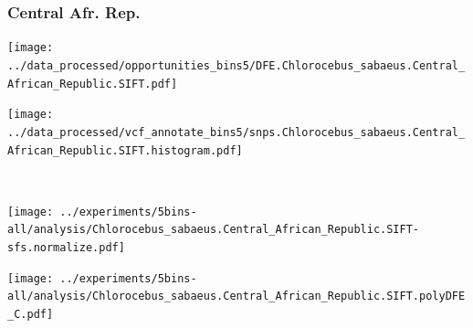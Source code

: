 \subsubsection{Central Afr. Rep.}

\begin{minipage}{0.49\linewidth}
    \texttt{[image: ../data\_processed/opportunities\_bins5/DFE.Chlorocebus\_sabaeus.Central\_African\_Republic.SIFT.pdf]}
\end{minipage}
\begin{minipage}{0.49\linewidth}
    \texttt{[image: ../data\_processed/vcf\_annotate\_bins5/snps.Chlorocebus\_sabaeus.Central\_African\_Republic.SIFT.histogram.pdf]}
\end{minipage}
\\
\begin{minipage}{0.49\linewidth}
    \texttt{[image: ../experiments/5bins-all/analysis/Chlorocebus\_sabaeus.Central\_African\_Republic.SIFT-sfs.normalize.pdf]}
\end{minipage}
\begin{minipage}{0.4\linewidth}
    \texttt{[image: ../experiments/5bins-all/analysis/Chlorocebus\_sabaeus.Central\_African\_Republic.SIFT.polyDFE\_C.pdf]}
\end{minipage}
